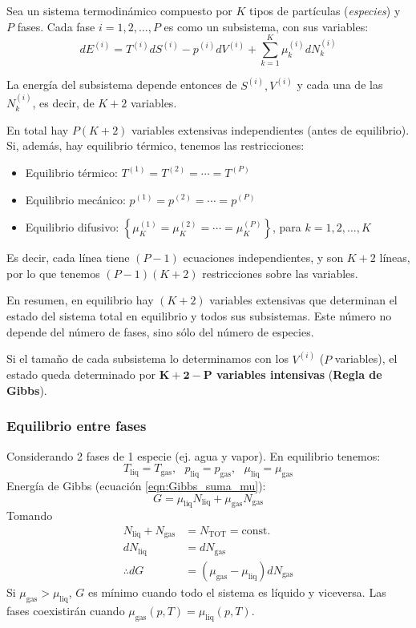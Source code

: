 \documentclass[]{article}
\numberwithin{equation}{section}
\newcommand{\0}{\textcolor{gray}{0}}
\begin{document}
Sea un sistema termodinámico compuesto por \(K\) tipos de partículas (\textit{especies}) y \(P\) fases. Cada fase \(i=1,2,\ldots,P\) es como un subsistema, con sus variables:
\begin{equation}
	dE^{(i)} = T^{(i)}dS^{(i)} - p^{(i)}dV^{(i)} + \sum_{k=1}^{K}\mu_k^{(i)} dN_k^{(i)}
\end{equation}

La energía del subsistema depende entonces de \(S^{(i)}, V^{(i)}\) y cada una de las \(N_k^{(i)}\), es decir, de \(K+2\) variables.

En total hay \(P(K+2)\) variables extensivas independientes (antes de equilibrio). Si, además, hay equilibrio térmico, tenemos las restricciones:
\begin{itemize}
	\item Equilibrio térmico: \(T^{(1)} = T^{(2)} = \cdots = T^{(P)}\)
	\item Equilibrio mecánico: \(p^{(1)} = p^{(2)} = \cdots = p^{(P)}\)
	\item Equilibrio difusivo: \(\left\lbrace \mu_K^{(1)} = \mu_K^{(2)} = \cdots = \mu_K^{(P)}\right\rbrace \), para \(k=1,2,\ldots,K\)
\end{itemize}
Es decir, cada línea tiene \((P-1)\) ecuaciones independientes, y son \(K+2\) líneas, por lo que tenemos \((P-1)(K+2)\) restricciones sobre las variables.

En resumen, en equilibrio hay \((K+2)\) variables extensivas que determinan el estado del sistema total en equilibrio y todos sus subsistemas. Este número no depende del número de fases, sino sólo del número de especies.

Si el tamaño de cada subsistema lo determinamos con los \(V^{(i)}\) (\(P\) variables), el estado queda determinado por \textbf{\(\mathbf{K+2-P}\) variables intensivas} (\textbf{Regla de Gibbs}).

\subsubsection{Equilibrio entre fases}
Considerando 2 fases de 1 especie (ej. agua y vapor). En equilibrio tenemos:
\begin{equation*}
	T_{\text{liq}} = T_{\text{gas}},\ \ \ p_{\text{liq}} = p_{\text{gas}},\ \ \ \mu_{\text{liq}} = \mu_{\text{gas}}
\end{equation*}
Energía de Gibbs (ecuación \ref{eqn:Gibbs_suma_mu}):
\begin{equation*}
	G = \mu_{\text{liq}}N_{\text{liq}} + \mu_{\text{gas}}N_{\text{gas}}
\end{equation*}
Tomando
\begin{align*}
	N_{\text{liq}} + N_{\text{gas}} &= N_{\text{TOT}} = \text{const.}\\
	dN_{\text{liq}} &= dN_{\text{gas}}\\
	\therefore dG &= (\mu_{\text{gas}} - \mu_{\text{liq}})dN_{\text{gas}}
\end{align*}
Si \(\mu_{\text{gas}} > \mu_{\text{liq}}\), \(G\) es mínimo cuando todo el sistema es líquido y viceversa. Las fases coexistirán cuando \(\mu_{\text{gas}}(p,T)=\mu_{\text{liq}}(p,T)\).
\end{document}
